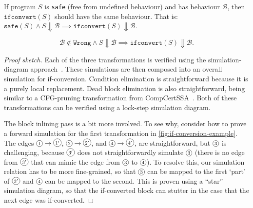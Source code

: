 \begin{theorem}\label{def:forwardsim}
  If program $S$ is \texttt{safe} (free from
  undefined behaviour) and has behaviour
  $\mathcal{B}$, then $\mathtt{ifconvert}(S)$ should have the same behaviour. That is: $\mathtt{safe}(S) \land S \Downarrow \mathcal{B} \implies \mathtt{ifconvert}(S) \Downarrow \mathcal{B}$.

  {\normalfont\begin{equation}
    \mathcal{B} \not\in \texttt{Wrong} \land S \Downarrow \mathcal{B} \implies
    \texttt{ifconvert}(S) \Downarrow \mathcal{B}.
  \end{equation}}

  \begin{proof}[Proof sketch]
    Each of the three transformations is verified using the simulation-diagram
    approach~\cite[p.~379]{leroy09_formal_verif_compil_back_end}. These
    simulations are then composed into an overall simulation for if-conversion.
    Condition elimination is straightforward because it is a purely local
    replacement.
    Dead block elimination is also straightforward, being similar to a
    CFG-pruning transformation from
    CompCertSSA~\cite{barthe14_formal_verif_ssa_based_middl_end_compc}.  Both of
    these transformations can be verified using a lock-step simulation diagram.

    The block inlining pass is a bit more involved.  To see why, consider how to
    prove a forward simulation for the first transformation in
    \cref{fig:if-conversion-example}. The edges
    $\diaglabel{$1$}\rightarrow\diaglabel{$1^\prime$}$,
    $\diaglabel{$2$}\rightarrow\diaglabel{$2^\prime$}$, and
    $\diaglabel{$4$}\rightarrow\diaglabel{$4^\prime$}$, are straightforward, but
    $\diaglabel{$3$}$ is challenging, because $\diaglabel{$3^\prime$}$ does not
    straightforwardly simulate $\diaglabel{$3$}$ (there is no edge from
    $\diaglabel{$3^\prime$}$ that can mimic the edge from $\diaglabel{$3$}$ to
    $\diaglabel{$4$}$). To resolve this, our simulation relation has to be more
    fine-grained, so that $\diaglabel{$3$}$ can be mapped to the first `part' of
    $\diaglabel{$3^\prime$}$ and $\diaglabel{$4$}$ can be mapped to the second.
    This is proven using a \enquote{star} simulation diagram, so that the
    if-converted block can stutter in the case that the next edge was
    if-converted.
  \end{proof}
\end{theorem}

